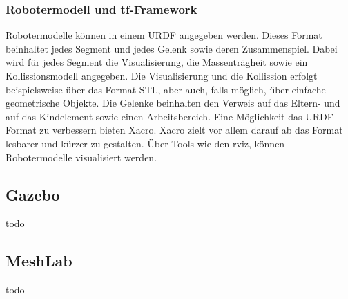 \subsubsection{Robotermodell und tf-Framework}

Robotermodelle können in einem \ac{URDF} angegeben werden. Dieses Format beinhaltet jedes Segment und jedes Gelenk sowie deren Zusammenspiel. Dabei wird für jedes Segment die Visualisierung, die Massenträgheit sowie ein Kollissionsmodell angegeben. Die Visualisierung und die Kollission erfolgt beispielsweise über das Format \ac{STL}, aber auch, falls möglich, über einfache geometrische Objekte. Die Gelenke beinhalten den Verweis auf das Eltern- und auf das Kindelement sowie einen Arbeitsbereich. Eine Möglichkeit das \ac{URDF}-Format zu verbessern bieten \ac{Xacro}. \ac{Xacro} zielt vor allem darauf ab das Format lesbarer und kürzer zu gestalten. Über Tools wie den rviz, können Robotermodelle visualisiert werden.

\subsection{Gazebo}

todo

\subsection{MeshLab}

todo \autocite{LocalChapterEvents:ItalChap:ItalianChapConf2008:129-136}